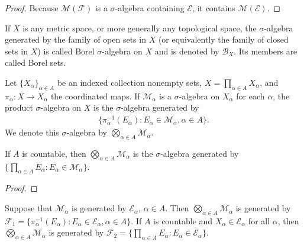 \begin{proof}
Because $\mathcal{M}(\mathcal{F})$ is a $\sigma$-algebra containing $\mathcal{E}$, it contains $\mathcal{M}(\mathcal{E})$.
\end{proof}

\begin{definition}
If $X$ is any metric space, or more generally any topological space, the $\sigma$-algebra generated by the family of open sets in $X$ (or equivalently the family of closed sets in $X$) is called Borel $\sigma$-algebra on $X$ and is denoted by $\mathcal{B}_{X}$.
Its members are called Borel sets.
\end{definition}

\begin{definition}
Let $\{ X_{\alpha} \}_{\alpha \in A}$ be an indexed collection nonempty sets, $X = \prod_{\alpha \in A} X_{\alpha}$, and $\pi_{\alpha}: X \to X_{\alpha}$ the coordinated maps.
If $\mathcal{M}_{\alpha}$ is a $\sigma$-algebra on $X_{\alpha}$ for each $\alpha$, the product $\sigma$-algebra on $X$ is the $\sigma$-algebra generated by 
\begin{align}
\{ \pi_{\alpha}^{-1} (E_\alpha) : E_{\alpha} \in \mathcal{M}_{\alpha}, \alpha \in A \}.
\end{align}
We denote this $\sigma$-algebra by $\bigotimes_{\alpha \in A} \mathcal{M}_{\alpha}$.
\end{definition}

\begin{proposition}
If $A$ is countable, then $\bigotimes_{\alpha \in A} \mathcal{M}_{\alpha}$ is the $\sigma$-algebra generated by $\{ \prod_{\alpha \in A} E_{\alpha} : E_{\alpha} \in \mathcal{M}_{\alpha} \}$.
\end{proposition}

\begin{proof}
    
\end{proof}

\begin{proposition}
Suppose that $\mathcal{M}_{\alpha}$ is generated by $\mathcal{E}_{\alpha}$, $\alpha \in A$.
Then $\bigotimes_{\alpha \in A} \mathcal{M}_{\alpha}$ is generated by $\mathcal{F}_1 = \{ \pi_{\alpha}^{-1} (E_\alpha) : E_{\alpha} \in \mathcal{E}_{\alpha}, \alpha \in A \}$.
If $A$ is countable and $X_\alpha \in \mathcal{E}_{\alpha}$ for all $\alpha$, then $\bigotimes_{\alpha \in A} \mathcal{M}_{\alpha}$ is generated by $\mathcal{F}_2 = \{ \prod_{\alpha \in A} E_{\alpha} : E_{\alpha} \in \mathcal{E}_{\alpha}  \}$.
\end{proposition}

